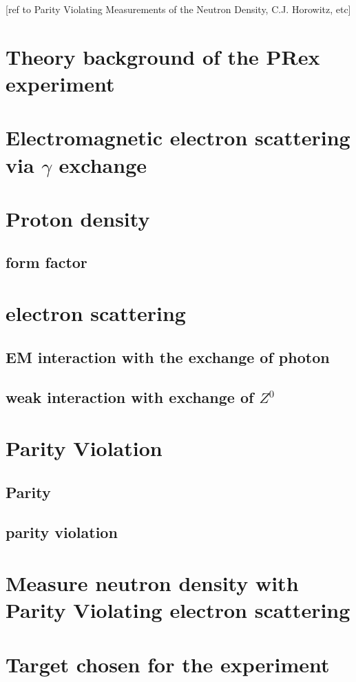 [ref to Parity Violating Measurements of the Neutron Density, C.J. Horowitz, etc]

\section{Theory background of the PRex experiment}



\section{Electromagnetic electron scattering via $\gamma$ exchange}
\section{Proton density}
\subsection{form factor}
\section{electron scattering}
\subsection{EM interaction with the exchange of photon}
\subsection{weak interaction with exchange of $Z^0$}


\section{Parity Violation}
\subsection{Parity}

\subsection{parity violation}

\section{Measure neutron density with Parity Violating electron scattering}

\section{Target chosen for the experiment}
